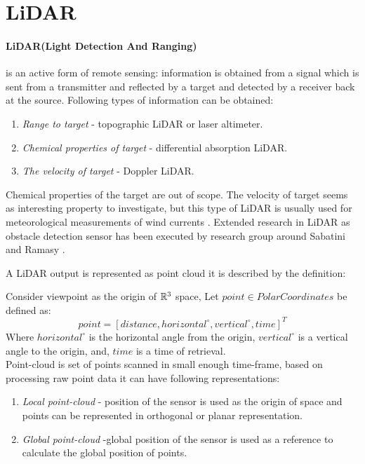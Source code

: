 \section{LiDAR}\label{sec:LiDARStateOfArt}
\noindent \paragraph{LiDAR(Light Detection And Ranging)} is an active form of remote sensing: information is obtained from a signal which is sent from a transmitter and reflected by a target and detected by a receiver back at the source. Following types of information can be obtained:
\begin{enumerate}
\item \textit{Range to target} - topographic LiDAR or laser altimeter.
\item \textit{Chemical properties of target} - differential absorption LiDAR.
\item \textit{The velocity of target} - Doppler LiDAR.
\end{enumerate}

\noindent Chemical properties of the target are out of scope. The velocity of  target seems as interesting property to investigate, but this type of LiDAR is usually used for meteorological measurements of wind currents \cite{martin2011meteorological}. Extended research in LiDAR as obstacle detection sensor has been executed by research group around Sabatini \cite{sabatini2014lidar} and Ramasy \cite{ramasamy2016lidar}. 

A LiDAR output is represented as point cloud it is described by the definition:

\begin{definition}
Consider viewpoint as the origin of $\mathbb{R}^3$ space,  Let  $point \in Polar Coordinates$ be defined as:
    \begin{equation}
        point = [ distance, horizontal^\circ, vertical^\circ, time ]^T
    \end{equation}
    Where $horizontal^\circ$ is the horizontal angle from the origin, $vertical^\circ$ is a vertical angle to the origin, and, $time$ is a time of retrieval.\\

    \noindent Point-cloud is set of points scanned in small enough time-frame, based on processing raw point data it can have following representations:
    
    \begin{enumerate}
        \item \emph{Local point-cloud} - position of the sensor is used as the origin of space and points can be represented in orthogonal or planar representation. 
        
        \item \emph{Global point-cloud} -global position of the sensor is used as a reference to calculate the global position of points.
    \end{enumerate}
\end{definition}

